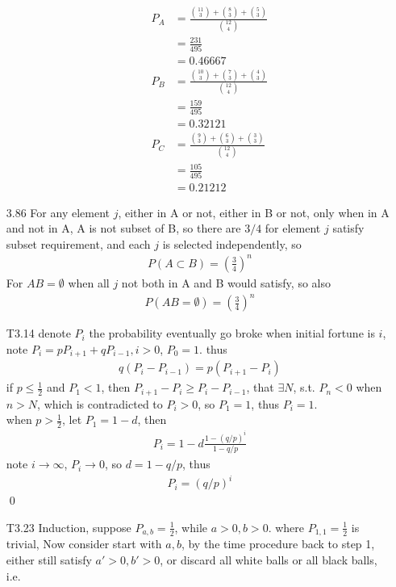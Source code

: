 \documentclass[paper=a4, fontsize=11pt]{scrartcl} %
\numberwithin{equation}{section} %
\numberwithin{figure}{section} %
\numberwithin{table}{section} %
\begin{document}
\begin{itemize}
\begin{itemize}
\begin{align}
			P_A &= \frac{ {11\choose 3} + {8\choose 3} + {5\choose 3} }{{12\choose 4}} \\
				&= \frac{231}{495}\\
				&= 0.46667\\
			P_B &= \frac{ {10\choose 3} + {7\choose 3} + {4\choose 3} }{{12\choose 4}}\\
				&= \frac{159}{495}\\
				&= 0.32121\\
			P_C &= \frac{ {9\choose 3} + {6\choose 3} + {3\choose 3} }{{12\choose 4}}\\
				&= \frac{105}{495}\\
				&= 0.21212
		\end{align}
	\end{itemize}
	\item[3.86] For any element $j$, either in A or not, either in B or not, only when in A and not in A, A is not subset of B, so there are $3/4$ for element $j$ satisfy subset requirement, and each $j$ is selected independently, so
	\begin{align}
		P(A\subset B) = \left(\frac{3}{4}\right)^n
	\end{align}
	For $AB=\emptyset$ when all $j$ not both in A and B would satisfy, so also
	\begin{align}
		P(AB=\emptyset) = \left(\frac{3}{4}\right)^n
	\end{align}
	\item[T3.14] denote $P_i$ the probability eventually go broke when initial fortune is $i$, note $P_i =pP_{i+1}+qP_{i-1}, i>0$, $P_0=1$. thus
	\begin{align}
		q(P_i-P_{i-1}) = p(P_{i+1}-P_i)
	\end{align}
	if $p\leq\frac{1}{2}$ and $P_1<1$, then $P_{i+1}-P_i \geq P_i-P_{i-1}$, that $\exists N$, s.t. $P_n<0$ when $n>N$, which is contradicted to $P_i>0$, so $P_1=1$, thus $P_i=1$.\\
	when $p>\frac{1}{2}$, let $P_1=1-d$, then
	\begin{align}
		P_i = 1 - d\frac{1-(q/p)^i}{1-q/p}
	\end{align}
	note $i\rightarrow\infty$, $P_i\rightarrow 0$, so $d= 1-q/p$, thus
	\begin{align}
		P_i = (q/p)^i
	\end{align}\qed
	\item[T3.23] Induction, suppose $P_{a,b}=\frac{1}{2}$, while $a>0, b>0$. where $P_{1,1}=\frac{1}{2}$ is trivial, Now consider start with $a,b$, by the time procedure back to step 1, either still satisfy $a'>0,b'>0$, or discard all white balls or all black balls, i.e.

\end{itemize}
\end{document}
